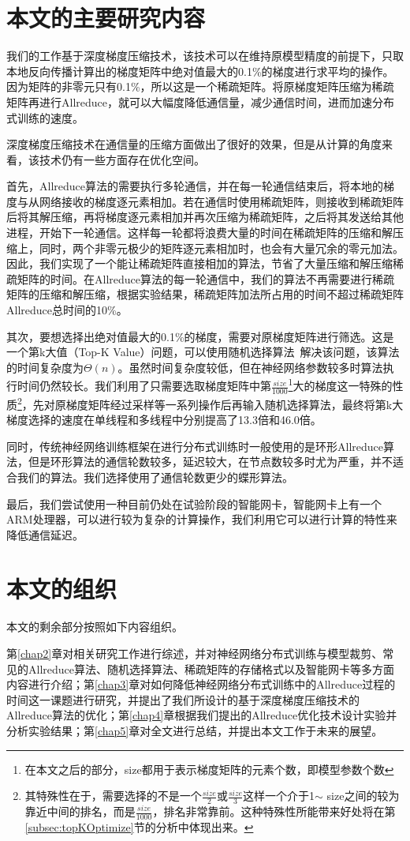\section{本文的主要研究内容}
我们的工作基于深度梯度压缩技术，该技术可以在维持原模型精度的前提下，只取本地反向传播计算出的梯度矩阵中绝对值最大的0.1\%的梯度进行求平均的操作。因为矩阵的非零元只有0.1\%，所以这是一个稀疏矩阵。将原梯度矩阵压缩为稀疏矩阵再进行Allreduce，就可以大幅度降低通信量，减少通信时间，进而加速分布式训练的速度。

深度梯度压缩技术在通信量的压缩方面做出了很好的效果，但是从计算的角度来看，该技术仍有一些方面存在优化空间。

首先，Allreduce算法的需要执行多轮通信，并在每一轮通信结束后，将本地的梯度与从网络接收的梯度逐元素相加。若在通信时使用稀疏矩阵，则接收到稀疏矩阵后将其解压缩，再将梯度逐元素相加并再次压缩为稀疏矩阵，之后将其发送给其他进程，开始下一轮通信。这样每一轮都将浪费大量的时间在稀疏矩阵的压缩和解压缩上，同时，两个非零元极少的矩阵逐元素相加时，也会有大量冗余的零元加法。因此，我们实现了一个能让稀疏矩阵直接相加的算法，节省了大量压缩和解压缩稀疏矩阵的时间。在Allreduce算法的每一轮通信中，我们的算法不再需要进行稀疏矩阵的压缩和解压缩，根据实验结果，稀疏矩阵加法所占用的时间不超过稀疏矩阵Allreduce总时间的10\%。

其次，要想选择出绝对值最大的0.1\%的梯度，需要对原梯度矩阵进行筛选。这是一个第k大值（Top-K Value）问题，可以使用随机选择算法~\cite{IntroToAlgo}解决该问题，该算法的时间复杂度为$\Theta(n)$。虽然时间复杂度较低，但在神经网络参数较多时算法执行时间仍然较长。我们利用了只需要选取梯度矩阵中第$\frac{size}{1000}$\footnote{在本文之后的部分，size都用于表示梯度矩阵的元素个数，即模型参数个数}大的梯度这一特殊的性质\footnote{其特殊性在于，需要选择的不是一个$\frac{size}{2}$或$\frac{size}{3}$这样一个介于1$\sim$ size之间的较为靠近中间的排名，而是$\frac{size}{1000}$，排名非常靠前。这种特殊性所能带来好处将在第\ref{subsec:topKOptimize}节的分析中体现出来。}，先对原梯度矩阵经过采样等一系列操作后再输入随机选择算法，最终将第k大梯度选择的速度在单线程和多线程中分别提高了13.3倍和46.0倍。

同时，传统神经网络训练框架在进行分布式训练时一般使用的是环形Allreduce算法，但是环形算法的通信轮数较多，延迟较大，在节点数较多时尤为严重，并不适合我们的算法。我们选择使用了通信轮数更少的蝶形算法。

最后，我们尝试使用一种目前仍处在试验阶段的智能网卡，智能网卡上有一个ARM处理器，可以进行较为复杂的计算操作，我们利用它可以进行计算的特性来降低通信延迟。

\section{本文的组织}

本文的剩余部分按照如下内容组织。

第\ref{chap2}章对相关研究工作进行综述，并对神经网络分布式训练与模型裁剪、常见的Allreduce算法、随机选择算法、稀疏矩阵的存储格式以及智能网卡等多方面内容进行介绍；第\ref{chap3}章对如何降低神经网络分布式训练中的Allreduce过程的时间这一课题进行研究，并提出了我们所设计的基于深度梯度压缩技术的Allreduce算法的优化；第\ref{chap4}章根据我们提出的Allreduce优化技术设计实验并分析实验结果；第\ref{chap5}章对全文进行总结，并提出本文工作于未来的展望。